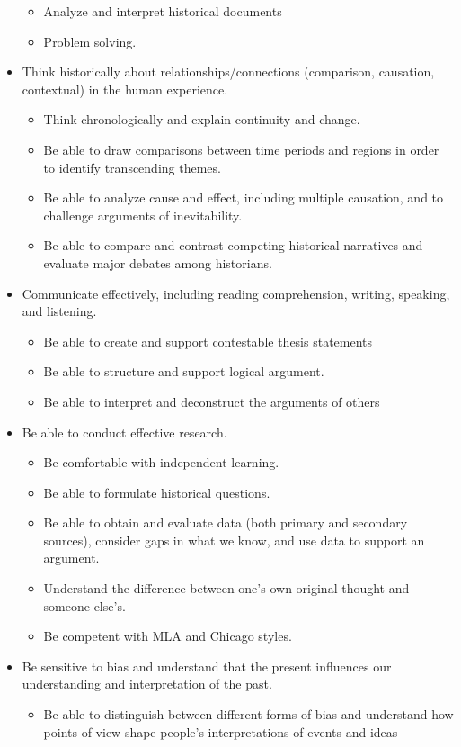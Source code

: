 \begin{itemize}
\begin{itemize}
      \item Analyze and interpret historical documents
      \item Problem solving.
\end{itemize}
  \item Think historically about relationships/connections (comparison, causation, contextual) in the human experience.  
  \begin{itemize}
    \item Think chronologically and explain continuity and change. 
    \item Be able to draw comparisons between time periods and regions in order to identify transcending themes. 
    \item Be able to analyze cause and effect, including multiple causation, and to challenge arguments of inevitability.
    \item Be able to compare and contrast competing historical narratives and evaluate major debates among historians. 
  \end{itemize}
  \item Communicate effectively, including reading comprehension, writing, speaking, and listening.
  \begin{itemize}


    \item Be able to create and support contestable thesis statements
    \item Be able to structure and support logical argument.
    \item Be able to interpret and deconstruct the arguments of others
  \end{itemize}
  
  \item Be able to conduct effective research.
  \begin{itemize}


    \item Be comfortable with independent learning.
    \item Be able to formulate historical questions. 
    \item Be able to obtain and evaluate data (both primary and secondary sources), consider gaps in what we know, and use data to support an argument.
    \item Understand the difference between one’s own original thought and someone else's.
    \item Be competent with MLA and Chicago styles. 
  \end{itemize}
  \item Be sensitive to bias and understand that the present influences our understanding and interpretation of the past.

\begin{itemize}
  \item Be able to distinguish between different forms of bias and understand how points of view shape people’s interpretations of events and ideas
\end{itemize}
\end{itemize}